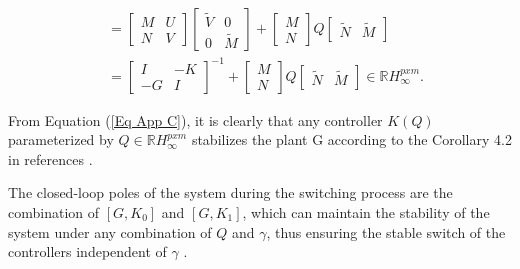 \documentclass[a4paper,fleqn]{cas-sc}
\begin{document}
\begin{equation}
\begin{aligned}
                                                 & =\left[\begin{array}{cc}M & U \\ N & V\end{array}\right]\left[\begin{array}{cc}\tilde{V} & 0 \\ 0 & \tilde{M}\end{array}\right]+\left[\begin{array}{c}M \\ N\end{array}\right] Q\left[\begin{array}{cc}\tilde{N} & \tilde{M}\end{array}\right]                              \\
                                                 & =\left[\begin{array}{cc}
        I  & -K \\
        -G & I
      \end{array}\right]^{-1}+\left[\begin{array}{c}
        M \\
        N
      \end{array}\right] Q\left[\begin{array}{cc}
        \tilde{N} & \tilde{M}
      \end{array}\right] \in \mathbb{R} H_{\infty}^{p x m}.
  \end{aligned}
  \label{Eq App C}
\end{equation}

From Equation (\ref{Eq App C}), it is clearly that any controller $K(Q)$ parameterized by $Q \in \mathbb{R} H_{\infty}^{p x m} $ stabilizes the plant G according to the Corollary 4.2 in references \citep{tay1998high,MAHTOUT202081}.

The closed-loop poles of the system during the switching process are the combination of $[G,K_0]$ and $[G,K_1]$, which can maintain the stability of the system under any combination of $Q$ and $\gamma$, thus ensuring the stable switch of the controllers independent of $\gamma$ \citep{niemann1999architecture}.
\end{document}
